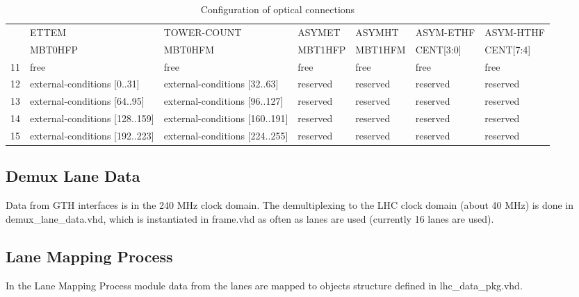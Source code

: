 \begin{table}[htdp]
\begin{center}
\begin{tabular}{c|m{}|m{}|m{}|m{}|m{}|m{}|}
\multicolumn{1}{|c|}{} &
\multicolumn{1}{l|}{ETTEM} & TOWER-COUNT & ASYMET & ASYMHT & ASYM-ETHF & ASYM-HTHF \\
\multicolumn{1}{|c|}{} &
\multicolumn{1}{l|}{MBT0HFP} & MBT0HFM & MBT1HFP & MBT1HFM & CENT[3:0] & CENT[7:4] \\\hline
\multicolumn{1}{|c|}{11} & free & free & free & free & free & free \\\hline
\multicolumn{1}{|c|}{12} & external-conditions [0..31] & external-conditions [32..63] & reserved & reserved & reserved & reserved \\\hline
\multicolumn{1}{|c|}{13} & external-conditions [64..95] & external-conditions [96..127] & reserved & reserved & reserved & reserved \\\hline
\multicolumn{1}{|c|}{14} & external-conditions [128..159] & external-conditions [160..191] & reserved & reserved & reserved & reserved \\\hline
\multicolumn{1}{|c|}{15} & external-conditions [192..223] & external-conditions [224..255] & reserved & reserved & reserved & reserved \\\hline
\end{tabular}
\end{center}
\caption{Configuration of optical connections}
\label{tab:framework:tab_configuration_optical_conn}
\end{table}

%
%

\subsection{Demux Lane Data} \label{sec:demux_lane_data}
Data from GTH interfaces is in the 240 MHz clock domain. The demultiplexing to the LHC clock domain (about 40 MHz) is done in demux\_lane\_data.vhd, which is instantiated
in frame.vhd as often as lanes are used (currently 16 lanes are used). 

%
%

\subsection{Lane Mapping Process} \label{sec:lmp}
In the Lane Mapping Process module data from the lanes are mapped to objects structure defined in lhc\_data\_pkg.vhd.

